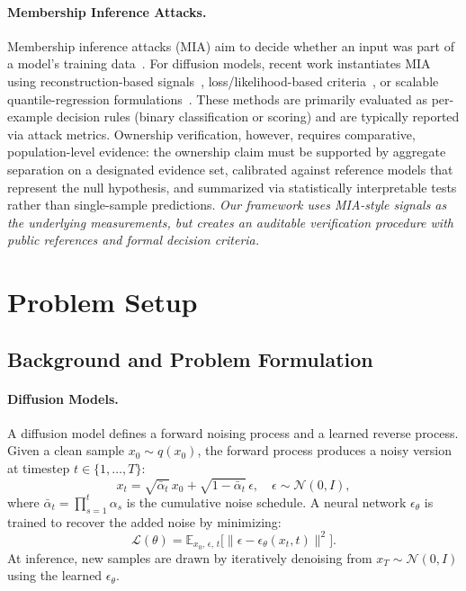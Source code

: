 \documentclass{article}
\begin{document}
\paragraph{Membership Inference Attacks.}
Membership inference attacks (MIA) aim to decide whether an input was part of a model's training data~\citep{shokri2017membership,yeom2018privacy,salem2019ml}.
For diffusion models, recent work instantiates MIA using reconstruction-based signals~\citep{carlini2023extracting,duan2023diffusion,kong2024efficient}, loss/likelihood-based criteria~\citep{matsumoto2023membership,hu2023loss}, or scalable quantile-regression formulations~\citep{bertran2023scalable,tang2024membership}.
These methods are primarily evaluated as per-example decision rules (binary classification or scoring) and are typically reported via attack metrics.
Ownership verification, however, requires comparative, population-level evidence: the ownership claim must be supported by aggregate separation on a designated evidence set, calibrated against reference models that represent the null hypothesis, and summarized via statistically interpretable tests rather than single-sample predictions.
\textit{Our framework uses MIA-style signals as the underlying measurements, but creates an auditable verification procedure with public references and formal decision criteria.}
\section{Problem Setup}
\label{sec:problem}

\subsection{Background and Problem Formulation }

\paragraph{Diffusion Models.}
A diffusion model defines a forward noising process and a learned 
reverse process. Given a clean sample $x_0 \sim q(x_0)$, the 
forward process produces a noisy version at timestep $t \in 
\{1, \dots, T\}$:
%
\begin{equation}
    x_t = \sqrt{\bar\alpha_t}\, x_0 
        + \sqrt{1 - \bar\alpha_t}\,\epsilon, 
    \quad \epsilon \sim \mathcal{N}(0, I),
\end{equation}
%
where $\bar\alpha_t = \prod_{s=1}^{t} \alpha_s$ is the cumulative 
noise schedule. A neural network $\epsilon_\theta$ is trained to 
recover the added noise by minimizing:
%
\begin{equation}
    \mathcal{L}(\theta) 
    = \mathbb{E}_{x_0,\, \epsilon,\, t}
      \bigl[\lVert \epsilon 
      - \epsilon_\theta(x_t, t) \rVert^2\bigr].
\end{equation}
%
At inference, new samples are drawn by iteratively denoising from 
$x_T \sim \mathcal{N}(0, I)$ using the learned 
$\epsilon_\theta$.
\end{document}
